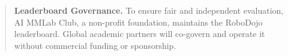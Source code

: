 \begin{abstract}
\begin{tcolorbox}[
colback=Blue_1!5,
colframe=Blue_1!55,
boxrule=0.5pt,
arc=2pt,
left=6pt,
right=6pt,
top=4pt,
bottom=4pt
]
\textbf{\textcolor{Blue_1}{Leaderboard Governance.}}
To ensure fair and independent evaluation, AI MMLab Club, a non-profit foundation, maintains the RoboDojo leaderboard. Global academic partners will co-govern and operate it without commercial funding or sponsorship. \end{tcolorbox}


\end{abstract}






